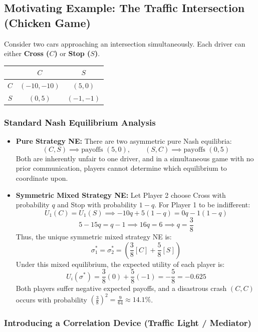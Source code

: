 \documentclass[12pt, a4paper]{article}
\begin{document}
\subsection{Motivating Example: The Traffic Intersection (Chicken Game)}

Consider two cars approaching an intersection simultaneously. Each driver can either \textbf{Cross ($C$)} or \textbf{Stop ($S$)}.

\begin{center}
\renewcommand{\arraystretch}{1.2}
\begin{tabular}{c|cc}
 & $C$ & $S$ \\ \hline
$C$ & $(-10, -10)$ & $(5, 0)$ \\
$S$ & $(0, 5)$ & $(-1, -1)$
\end{tabular}
\end{center}

\subsubsection{Standard Nash Equilibrium Analysis}
\begin{itemize}
    \item \textbf{Pure Strategy NE:} There are two asymmetric pure Nash equilibria:
    \[
      (C, S) \implies \text{payoffs } (5, 0), \qquad (S, C) \implies \text{payoffs } (0, 5)
    \]
    Both are inherently unfair to one driver, and in a simultaneous game with no prior communication, players cannot determine which equilibrium to coordinate upon.
    \item \textbf{Symmetric Mixed Strategy NE:} Let Player 2 choose Cross with probability $q$ and Stop with probability $1-q$. For Player 1 to be indifferent:
    \[
      U_1(C) = U_1(S) \implies -10q + 5(1-q) = 0q - 1(1-q)
    \]
    \[
      5 - 15q = q - 1 \implies 16q = 6 \implies q = \frac{3}{8}
    \]
    Thus, the unique symmetric mixed strategy NE is:
    \[
      \sigma_1^* = \sigma_2^* = \left( \frac{3}{8}[C] + \frac{5}{8}[S] \right)
    \]
    Under this mixed equilibrium, the expected utility of each player is:
    \[
      U_i(\sigma^*) = \frac{3}{8}(0) + \frac{5}{8}(-1) = -\frac{5}{8} = -0.625
    \]
    Both players suffer negative expected payoffs, and a disastrous crash $(C, C)$ occurs with probability $\left(\frac{3}{8}\right)^2 = \frac{9}{64} \approx 14.1\%$.
\end{itemize}

\subsubsection{Introducing a Correlation Device (Traffic Light / Mediator)}
\end{document}
